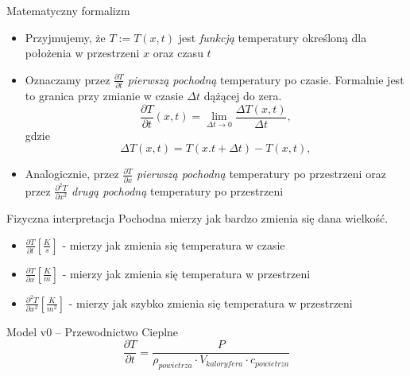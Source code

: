 \documentclass{beamer}
\theoremstyle{break}
\theoremstyle{break}
\theoremstyle{break}
\theoremstyle{break}
\theoremstyle{break}
\begin{document}
\begin{frame}{Matematyczny formalizm}
    \begin{itemize}
        \item Przyjmujemy, że $T := T(x, t)$ jest \textit{funkcją} temperatury określoną dla położenia w przestrzeni $x$ oraz czasu $t$
        \item Oznaczamy przez $\frac{\partial T}{\partial t}$ \textit{pierwszą pochodną} temperatury po czasie. Formalnie jest to granica przy zmianie w czasie $\Delta t$ dążącej do zera.
        \begin{equation*}
            \frac{\partial T}{\partial t}(x,t) = \lim_{\Delta t \rightarrow 0} \frac{\Delta T (x,t)}{\Delta t},
        \end{equation*}
        gdzie
        \begin{equation*}
            \Delta T(x,t) = T(x. t + \Delta t) - T(x, t), 
        \end{equation*}
        \item Analogicznie, przez $\frac{\partial T}{\partial x}$ \textit{pierwszą pochodną} temperatury po przestrzeni oraz przez $\frac{\partial^2 T}{\partial x^2}$ \textit{drugą pochodną} temperatury po przestrzeni
    \end{itemize}
\end{frame}

\begin{frame}{Fizyczna interpretacja}
    Pochodna mierzy jak bardzo zmienia się dana wielkość.
    \begin{itemize}
        \item $\frac{\partial T}{\partial t} \left[ \frac{K}{s} \right]$ - mierzy jak zmienia się temperatura w czasie
        
        \item $\frac{\partial T}{\partial x} \left[ \frac{K}{m} \right]$ - mierzy jak zmienia się temperatura w przestrzeni
        
        \item $\frac{\partial^2 T}{\partial x^2} \left[ \frac{K}{m^2} \right]$ - mierzy jak szybko zmienia się temperatura w przestrzeni
    \end{itemize}
\end{frame}

\begin{frame}{Model v0 -- Przewodnictwo Cieplne}
    \begin{equation*}
        \frac{\partial T}{\partial t} = \frac{P}{\rho_{powietrza} \cdot V_{kaloryfera} \cdot c_{powietrza}}
    \end{equation*}
\end{frame}
\end{document}
